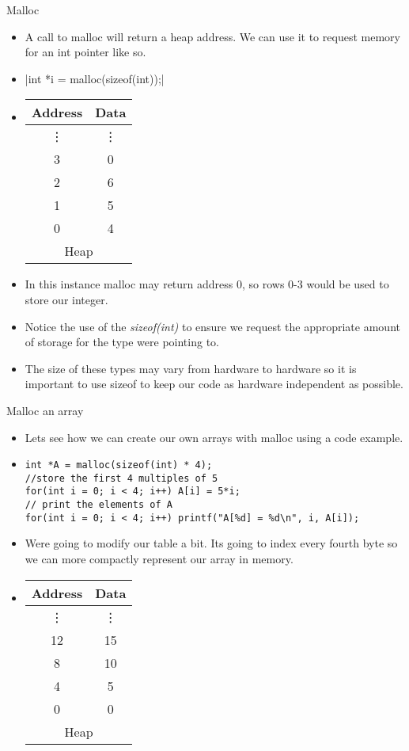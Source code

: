 \documentclass[10pt]{beamer}
\begin{document}
\begin{frame}[fragile]{Malloc} 
\begin{itemize}[<+->]
	\item A call to malloc will return a heap address. We can use it to request memory for an int pointer like so.
	\item {}|int *i = malloc(sizeof(int));|
	\item \begin{tabular}{|c|c|}
		\hline
		Address & Data\\
		\hline
		\vdots & \vdots \\
		\hline
		3&	0\\
		\hline
		2&	6\\
		\hline
		1&	5\\
		\hline
		0 &	4\\
		\hline
		\multicolumn{2}{|c|}{Heap}\\
		\hline
	\end{tabular}
	\item In this instance malloc may return address 0, so rows 0-3 would be used to store our integer.
	\item Notice the use of the {\it sizeof(int)} to ensure we request the appropriate amount of storage for the type were pointing to. 
	\item The size of these types may vary from hardware to hardware so it is important to use sizeof to keep our code as hardware independent as possible.
\end{itemize}
\end{frame}


\begin{frame}[fragile]{Malloc an array} 
\begin{itemize}[<+->]
	\item Lets see how we can create our own arrays with malloc using a code example.
	\item \begin{verbatim}
int *A = malloc(sizeof(int) * 4);
//store the first 4 multiples of 5
for(int i = 0; i < 4; i++) A[i] = 5*i;
// print the elements of A
for(int i = 0; i < 4; i++) printf("A[%d] = %d\n", i, A[i]);
	\end{verbatim}
	\item Were going to modify our table a bit. Its going to index every fourth byte so we can more compactly represent our array in memory.
	\item \begin{tabular}{|c|c|}
		\hline
		Address & Data\\
		\hline
		\vdots & \vdots \\
		\hline
		12&	15\\
		\hline
		8&	10\\
		\hline
		4&	5\\
		\hline
		0 &	0\\
		\hline
		\multicolumn{2}{|c|}{Heap}\\
		\hline
	\end{tabular}
\end{itemize}
\end{frame}
\end{document}
